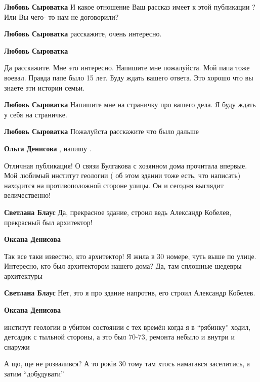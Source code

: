 \begin{itemize}
\begin{itemize}
\textbf{Любовь Сыроватка} И какое отношение Ваш рассказ имеет к этой публикации ? Или Вы чего- то нам не договорили?

\textbf{Любовь Сыроватка} расскажите, очень интересно.

\textbf{Любовь Сыроватка} 

Да расскажите. Мне это интересно. Напишите мне пожалуйста. Мой папа тоже
воевал. Правда папе было 15 лет. Буду ждать вашего ответа. Это хорошо что вы
знаете эти истории семьи.

\textbf{Любовь Сыроватка} Напишите мне на страничку про вашего дела. Я буду ждать у себя на страничке.

\textbf{Любовь Сыроватка} Пожалуйста расскажите что было дальше

\textbf{Ольга Денисова} , напишу .

\end{itemize} %


Отличная публикация! О связи Булгакова с хозяином дома прочитала впервые. Мой
любимый институт геологии ( об этом здании тоже есть, что написать) находится
на противоположной стороне улицы. Он и сегодня выглядит величественно!

\begin{itemize} %
\textbf{Светлана Блаус} Да, прекрасное здание, строил ведь Александр Кобелев, прекрасный был архитектор!

\textbf{Оксана Денисова} 

Так все таки известно, кто архитектор! Я жила в 30 номере, чуть выше по улице.
Интересно, кто был архитектором нашего дома? Да, там сплошные шедевры
архитектуры

\textbf{Светлана Блаус} Нет, это я про здание напротив, его строил Александр Кобелев.

\textbf{Оксана Денисова} 

институт геологии в убитом состоянии с тех времён когда я в \enquote{рябинку} ходил,
детсадик с тыльной стороны, а это был 70-73, ремонта небыло и внутри и снаружи

\end{itemize} %

А що, ще не розвалився? А то років 30 тому там хтось намагався заселитись, а затим \enquote{добудувати}


\end{itemize}
